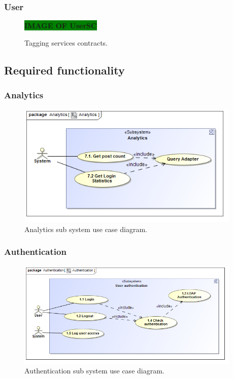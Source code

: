 \documentclass [a4paper,12pt] {article}
\begin{document}
		\subsubsection{User}
			\begin{figure}[H]
				\centering
				\large\textbf{\colorbox{green}{IMAGE OF UserSC}}
				\caption{Tagging services contracts.}
			\end{figure}
\pagebreak
	\subsection{Required functionality}
		\subsubsection{Analytics}
			\begin{figure}[H]
				\centering
				\includegraphics[width=0.95\textwidth]{AnalyticsUC.png}
				\caption{Analytics sub system use case diagram.}
			\end{figure}
		\subsubsection{Authentication}
			\begin{figure}[H]
				\centering
				\includegraphics[width=0.95\textwidth]{AuthenticationUC.png}
				\caption{Authentication sub system use case diagram.}
			\end{figure}
\end{document}
